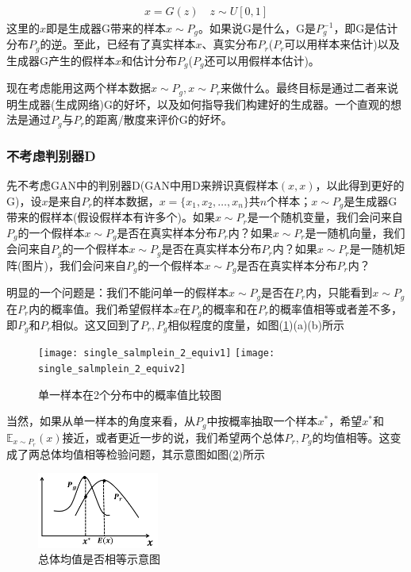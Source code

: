         \begin{align*}
        x = G(z)\quad z\sim U[0,1]
        \end{align*}
        这里的$x$即是生成器G带来的样本$x\sim P_g$。如果说G是什么，G是$P_g^{-1}$，即G是估计分布$P_g$的逆。至此，已经有了真实样本$x$、真实分布$P_r$($P_r$可以用样本来估计)以及生成器G产生的假样本$x$和估计分布$P_g$($P_g$还可以用假样本估计)。
        \par
        现在考虑能用这两个样本数据$x\sim P_g,x\sim P_r$来做什么。最终目标是通过二者来说明生成器(生成网络)G的好坏，以及如何指导我们构建好的生成器。一个直观的想法是通过$P_g$与$P_r$的距离/散度来评价G的好坏。
        \subsubsection{不考虑判别器D}
            \par
            先不考虑GAN中的判别器D(GAN中用D来辨识真假样本$(x,x)$，以此得到更好的G)，设$x$是来自$P_r$的样本数据，$x= \{x_1,x_2,\dots,x_n\}$共$n$个样本；$x\sim P_g$是生成器G带来的假样本(假设假样本有许多个)。如果$x\sim P_r$是一个随机变量，我们会问来自$P_g$的一个假样本$x\sim P_g$是否在真实样本分布$P_r$内？如果$x\sim P_r$是一随机向量，我们会问来自$P_g$的一个假样本$x\sim P_g$是否在真实样本分布$P_r$内？如果$x\sim P_r$是一随机矩阵(图片)，我们会问来自$P_g$的一个假样本$x\sim P_g$是否在真实样本分布$P_r$内？
            \par
            明显的一个问题是：我们不能问单一的假样本$x\sim P_g$是否在$P_r$内，只能看到$x\sim P_g$在$P_r$内的概率值。我们希望假样本$x$在$P_g$的概率和在$P_r$的概率值相等或者差不多，即$P_g$和$P_r$相似。这又回到了$P_r,P_g$相似程度的度量，如图(\ref{fig:单一样本在2个分布中的概率值比较图})(a)(b)所示
            \begin{figure}[H]
            \centering
            \texttt{[image: single\_salmplein\_2\_equiv1]}
            \qquad
            \texttt{[image: single\_salmplein\_2\_equiv2]}
            \caption{单一样本在2个分布中的概率值比较图}
            \label{fig:单一样本在2个分布中的概率值比较图}
            \end{figure}
            当然，如果从单一样本的角度来看，从$P_g$中按概率抽取一个样本$x^*$，希望$x^*$和$\mathbb{E}_{x\sim P_r}(x)$接近，或者更近一步的说，我们希望两个总体$P_r,P_g$的均值相等。这变成了两总体均值相等检验问题，其示意图如图(\ref{fig:2总体均值是否相等示意图})所示
                \begin{figure}[H]
                \centering
                \includegraphics[width=4cm]{images/2_equiv.jpg}
                \caption{总体均值是否相等示意图}
                \label{fig:2总体均值是否相等示意图}
                \end{figure}
